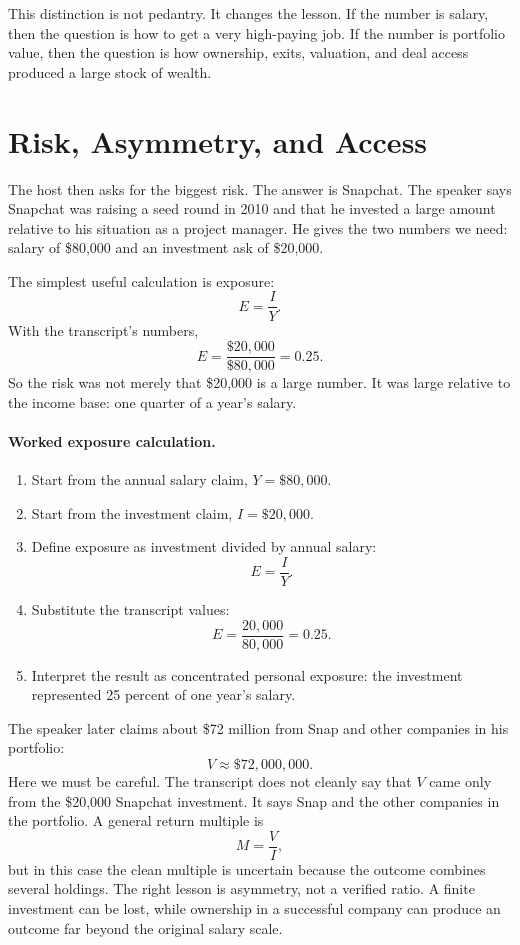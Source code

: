 This distinction is not pedantry. It changes the lesson. If the number is salary, then the question is how to get a very high-paying job. If the number is portfolio value, then the question is how ownership, exits, valuation, and deal access produced a large stock of wealth.

\section{Risk, Asymmetry, and Access}

The host then asks for the biggest risk. The answer is Snapchat. The speaker says Snapchat was raising a seed round in 2010 and that he invested a large amount relative to his situation as a project manager. He gives the two numbers we need: salary of \$80,000 and an investment ask of \$20,000.

The simplest useful calculation is exposure:
\begin{equation}
E=\frac{I}{Y}.
\end{equation}
With the transcript's numbers,
\begin{equation}
E=\frac{\$20{,}000}{\$80{,}000}=0.25.
\end{equation}
So the risk was not merely that \$20,000 is a large number. It was large relative to the income base: one quarter of a year's salary.

\paragraph{Worked exposure calculation.}
\begin{enumerate}
\item Start from the annual salary claim, \(Y=\$80{,}000\).
\item Start from the investment claim, \(I=\$20{,}000\).
\item Define exposure as investment divided by annual salary:
\[
E=\frac{I}{Y}.
\]
\item Substitute the transcript values:
\[
E=\frac{20{,}000}{80{,}000}=0.25.
\]
\item Interpret the result as concentrated personal exposure: the investment represented 25 percent of one year's salary.
\end{enumerate}

The speaker later claims about \$72 million from Snap and other companies in his portfolio:
\begin{equation}
V\approx \$72{,}000{,}000.
\end{equation}
Here we must be careful. The transcript does not cleanly say that \(V\) came only from the \$20,000 Snapchat investment. It says Snap and the other companies in the portfolio. A general return multiple is
\begin{equation}
M=\frac{V}{I},
\end{equation}
but in this case the clean multiple is uncertain because the outcome combines several holdings. The right lesson is asymmetry, not a verified ratio. A finite investment can be lost, while ownership in a successful company can produce an outcome far beyond the original salary scale.

